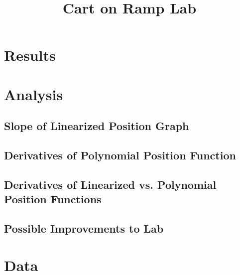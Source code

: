 \documentclass{article}
\title{Cart on Ramp Lab}
\begin{document}
\section{Results}
\section{Analysis}
\subsection{Slope of Linearized Position Graph}
\subsection{Derivatives of Polynomial Position Function}
\subsection{Derivatives of Linearized vs. Polynomial Position Functions}
\subsection{Possible Improvements to Lab}

\appendix
\section{Data}
\end{document}
